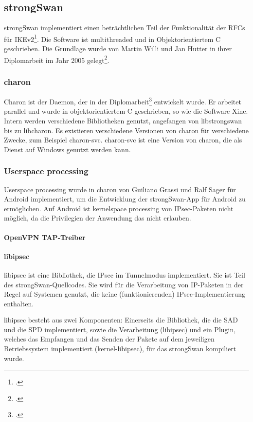 \subsection{strongSwan}
strongSwan implementiert einen beträchtlichen Teil der Funktionalität der \acp{RFC} für IKEv2\footcite{_ipsecstandards_2016}.
Die Software ist multithreaded und in Objektorientiertem C geschrieben.
Die Grundlage wurde von Martin Willi und Jan Hutter in ihrer Diplomarbeit im Jahr 2005 gelegt\footcite[][]{jan_hutter_strongswan_2005}.
\subsubsection{charon}
Charon ist der Daemon, der in der Diplomarbeit\footcite[][]{jan_hutter_strongswan_2005} entwickelt wurde.
Er arbeitet parallel und wurde in objektorientiertem C geschrieben, so wie die Software Xine.
Intern werden verschiedene Bibliotheken genutzt, angefangen von libstrongswan bis zu libcharon.
Es existieren verschiedene Versionen von charon für verschiedene Zwecke, zum Beispiel
charon-svc. charon-svc ist eine Version von charon, die als Dienst auf Windows genutzt werden kann.
\subsubsection{Userspace processing}
Userspace processing wurde in charon von Guiliano Grassi und Ralf Sager für Android implementiert,
um die Entwicklung der strongSwan-App für Android zu ermöglichen. Auf Android ist kernelspace processing
von \ac{IPsec}-Paketen nicht möglich, da die Privilegien der Anwendung das nicht erlauben.

\paragraph{OpenVPN TAP-Treiber}
\paragraph{libipsec}
libipsec ist eine Bibliothek, die IPsec im Tunnelmodus implementiert.
Sie ist Teil des strongSwan-Quellcodes. Sie wird für die Verarbeitung von IP-Paketen
in der Regel auf Systemen genutzt, die keine (funktionierenden) IPsec-Implementierung
enthalten.

libipsec besteht aus zwei Komponenten: Einerseits die Bibliothek, die die SAD und die SPD
implementiert, sowie die Verarbeitung (libipsec) und ein Plugin, welches das Empfangen und das Senden
der Pakete auf dem jeweiligen Betriebssystem implementiert (kernel-libipsec), für das strongSwan kompiliert wurde.

